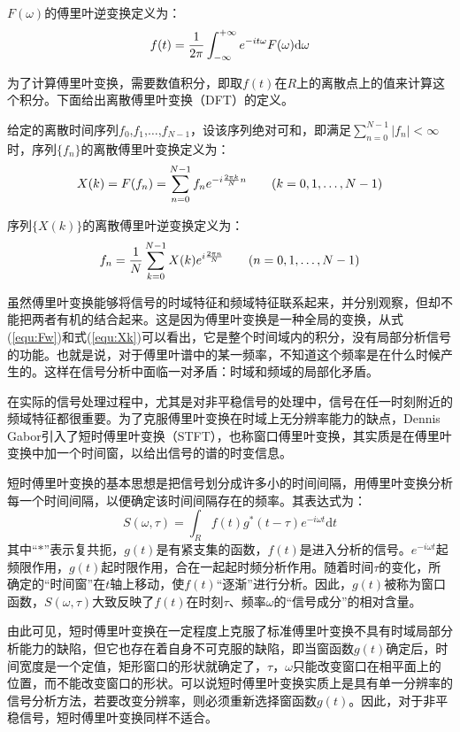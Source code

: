 $ F(\omega) $的傅里叶逆变换定义为：
\begin{equation}
	f(t) = {1\over2\pi} \int_{-\infty}^{+\infty} e^{-it\omega}F(\omega)\mathrm{d}\omega
\end{equation}

为了计算傅里叶变换，需要数值积分，即取$ f(t) $在$ R $上的离散点上的值来计算这个积分。下面给出离散傅里叶变换（DFT）的定义。

给定的离散时间序列$f_0$,$f_1$,$\ldots$,$f_{N-1}$，设该序列绝对可和，即满足$ \sum_{n=0}^{N-1} \left|f_n\right| < \infty $时，序列$ \{ f_n \} $的离散傅里叶变换定义为：
\begin{equation}
\label{equ:Xk}
	X(k) = F(f_n) = \sum_{n=0}^{N-1} f_n e^{-i {2\pi k\over N} n}\qquad
	(k=0,1,\ldots,N-1)
\end{equation}

序列$ \{ X(k) \} $的离散傅里叶逆变换定义为：
\begin{equation}
	f_n = {1\over N} \sum_{k=0}^{N-1} X(k) e^{i {2\pi n\over N}}\qquad
	(n=0,1,\ldots,N-1)
\end{equation}

虽然傅里叶变换能够将信号的时域特征和频域特征联系起来，并分别观察，但却不能把两者有机的结合起来。这是因为傅里叶变换是一种全局的变换，从式(\ref{equ:Fw})和式(\ref{equ:Xk})可以看出，它是整个时间域内的积分，没有局部分析信号的功能。也就是说，对于傅里叶谱中的某一频率，不知道这个频率是在什么时候产生的。这样在信号分析中面临一对矛盾：时域和频域的局部化矛盾。

在实际的信号处理过程中，尤其是对非平稳信号的处理中，信号在任一时刻附近的频域特征都很重要。为了克服傅里叶变换在时域上无分辨率能力的缺点，Dennis Gabor引入了短时傅里叶变换（STFT），也称窗口傅里叶变换，其实质是在傅里叶变换中加一个时间窗，以给出信号的谱的时变信息。

短时傅里叶变换的基本思想是把信号划分成许多小的时间间隔，用傅里叶变换分析每一个时间间隔，以便确定该时间间隔存在的频率。其表达式为：
\begin{equation}
	S(\omega,\tau) = \int_{R} f(t) g^{*}(t-\tau) e^{-i\omega t} \mathrm{d}t
\end{equation}
其中“$*$”表示复共扼，$g(t)$是有紧支集的函数，$f(t)$是进入分析的信号。$e^{-i\omega t}$起频限作用，$g(t)$起时限作用，合在一起起时频分析作用。随着时间$\tau$的变化，所确定的“时间窗”在$t$轴上移动，使$f(t)$“逐渐”进行分析。因此，$g(t)$被称为窗口函数，$S(\omega,\tau)$大致反映了$f(t)$在时刻$\tau$、频率$\omega$的“信号成分”的相对含量。

由此可见，短时傅里叶变换在一定程度上克服了标准傅里叶变换不具有时域局部分析能力的缺陷，但它也存在着自身不可克服的缺陷，即当窗函数$g(t)$确定后，时间宽度是一个定值，矩形窗口的形状就确定了，$\tau$，$\omega$只能改变窗口在相平面上的位置，而不能改变窗口的形状。可以说短时傅里叶变换实质上是具有单一分辨率的信号分析方法，若要改变分辨率，则必须重新选择窗函数$g(t)$。因此，对于非平稳信号，短时傅里叶变换同样不适合。

